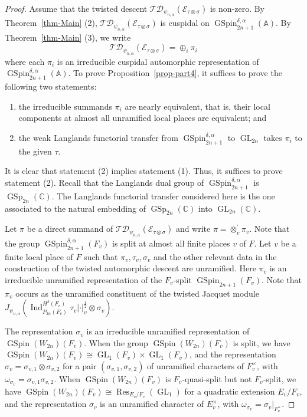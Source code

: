 \documentclass[12pt]{amsart}
\newcommand{\A}{\mathbb{A}}
\newcommand{\C}{\mathbb{C}}
\newcommand{\Res}{\operatorname{Res}}
\newcommand{\TD}{\mathcal{TD}}
\newcommand{\CE}{{\mathcal{E}}}
\theoremstyle{remark}
\DeclareMathOperator{\Ind}{Ind}
\DeclareMathOperator{\GL}{GL}
\DeclareMathOperator{\GSpin}{GSpin}
\DeclareMathOperator{\GSp}{GSp}
\begin{document}
\begin{proof}
Assume that the twisted descent $\TD_{\psi_{n,\alpha}}(\CE_{\tau\otimes\sigma})$ is non-zero. By Theorem~\ref{thm-Main} (2), $\TD_{\psi_{n,\alpha}}(\CE_{\tau\otimes\sigma})$ is cuspidal on $\GSpin_{2n+1}^{\delta,\alpha}(\A)$. By Theorem~\ref{thm-Main} (3), we write
$$
\TD_{\psi_{n,\alpha}}( \CE_{\tau\otimes\sigma})
=
\oplus_i\pi_i
$$
where each $\pi_i$ is an irreducible cuspidal automorphic representation of $\GSpin^{\delta,\alpha}_{2n+1}(\A)$. 
To prove Proposition~\ref{prop-part4}, it suffices to prove the following two statements:
\begin{enumerate}
\item the irreducible summands $\pi_i$ are nearly equivalent, that is, their local components at almost all unramified local places are equivalent; and
\item the weak Langlands functorial transfer from $\GSpin^{\delta,\alpha}_{2n+1}$ to $\GL_{2n}$ takes $\pi_i$ to the given $\tau$.
\end{enumerate}
It is clear that statement (2) implies statement (1). Thus, it suffices to prove statement (2). 
Recall that the Langlands dual group of $\GSpin_{2n+1}^{\delta,\alpha}$ is $\GSp_{2n}(\C)$. The Langlands functorial transfer considered here is the one associated to the natural embedding of $\GSp_{2n}(\C)$ into $\GL_{2n}(\C)$. 

Let $\pi$ be a direct summand of $\TD_{\psi_{n,\alpha}}(\CE_{\tau\otimes\sigma})$ and write $\pi=\otimes_v^\prime  \pi_v$. Note that the group $\GSpin_{2n+1}^{\delta,\alpha}(F_v)$ is split at almost all finite places $v$ of $F$. Let $v$ be a finite local place of $F$ such that $\pi_v, \tau_v,\sigma_v$ and the other relevant data in the construction of the twisted automorphic descent are unramified. Here $\pi_v$ is an irreducible unramified representation of the $F_v$-split $\GSpin_{2n+1}(F_v)$. Note that $\pi_v$ occurs as the unramified constituent of the twisted Jacquet module $J_{\psi_{n,\alpha}}(\Ind_{P_{2n}(F_v)}^{H^\delta(F_v)} \tau_v|\cdot|_v^{\frac{1}{2}}\otimes \sigma_v )$. 

The representation $\sigma_v$ is an irreducible unramified representation of $\GSpin(W_{2n})(F_v)$. When the group $\GSpin(W_{2n})(F_v)$ is split, we have $\GSpin(W_{2n})(F_v)\cong \GL_1(F_v) \times \GL_1(F_v)$, and the representation $\sigma_v=\sigma_{v,1}\otimes\sigma_{v,2}$ for a pair $(\sigma_{v,1}, \sigma_{v,2})$ of unramified characters  of $F_v^\times$, with $\omega_{\sigma_v}=\sigma_{v,1}\sigma_{v,2}$. When $\GSpin(W_{2n})(F_v)$ is $F_v$-quasi-split but not $F_v$-split, we have $\GSpin(W_{2n})(F_v)\cong \Res_{E_v/F_v}(\GL_1)$ for a quadratic extension $E_v/F_v$, and the representation $\sigma_v$ is an unramified character of $E_v^\times$, with $\omega_{\sigma_v}=\sigma_v|_{F_v^\times}$. 


\end{proof}
\end{document}
